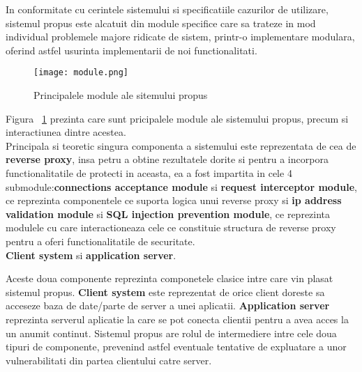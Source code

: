 In conformitate cu cerintele sistemului si specificatiile cazurilor de utilizare, sistemul propus este alcatuit din module specifice care sa trateze in mod individual problemele majore ridicate de sistem, printr-o implementare modulara, oferind astfel usurinta implementarii de noi functionalitati.

\begin{figure}[h]
	\centering
	\texttt{[image: module.png]}
	\caption{Principalele module ale sitemului propus}
	\label{fig:module}
\end{figure}
Figura ~\ref{fig:module} prezinta care sunt pricipalele module ale sistemului propus, precum si interactiunea dintre acestea. \\

Principala si teoretic singura componenta a sistemului este reprezentata de cea de \textbf{reverse proxy}, insa petru a obtine rezultatele dorite si pentru a incorpora functionalitatile de protecti in aceasta, ea a fost impartita in cele 4 submodule:\textbf{connections acceptance module} si \textbf{request interceptor module}, ce reprezinta componentele ce suporta logica unui reverse proxy si \textbf{ip address validation module} si \textbf{SQL injection prevention module}, ce reprezinta modulele cu care interactioneaza cele ce constituie structura de reverse proxy pentru a oferi functionalitatile de securitate.\\




\textbf{Client system} si  \textbf{application server}.

Aceste doua componente reprezinta componetele clasice intre care vin plasat sistemul propus. \textbf{Client system} este reprezentat de orice client doreste sa acceseze baza de date/parte de server a unei aplicatii. \textbf{Application server} reprezinta serverul aplicatie la care se pot conecta clientii pentru a avea acces la un anumit continut. Sistemul propus are rolul de intermediere intre cele doua tipuri de componente, prevenind astfel eventuale tentative de expluatare a unor vulnerabilitati din partea clientului catre server.

